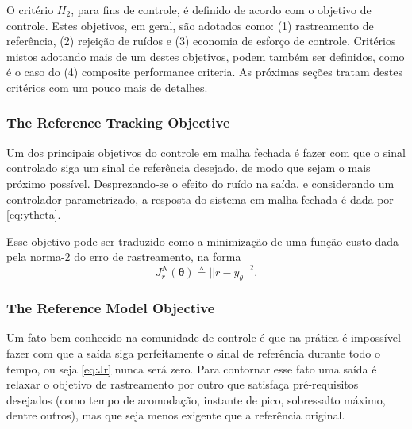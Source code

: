 O critério  $H_2$, para fins de controle, é definido de acordo com o objetivo de controle. Estes objetivos, em geral, são adotados como: (1) rastreamento de referência, (2) rejeição de ruídos e (3) economia de esforço de controle. Critérios mistos adotando mais de um destes objetivos, podem também ser definidos, como é o caso do (4) composite performance criteria. As próximas seções tratam destes critérios com um pouco mais de detalhes.


\subsubsection{The Reference Tracking Objective}%
\label{sub:the_reference_tracking_objective}
Um dos principais objetivos do controle em malha fechada é fazer com que o sinal controlado siga um sinal de referência desejado, de modo que sejam o mais próximo possível. Desprezando-se o efeito do ruído na saída, e considerando um controlador parametrizado, a resposta do sistema em malha fechada é dada por \eqref{eq:ytheta}.

Esse objetivo pode ser traduzido como a minimização de uma função custo dada pela norma-2 do erro de rastreamento, na forma
\begin{equation}
   J_r^N(\bm{\theta}) \triangleq || r - y_\theta ||^2 .
   \label{eq:Jr}
\end{equation}

\subsubsection{The Reference Model Objective}%
\label{sub:The Reference Model Objective}

Um fato bem conhecido na comunidade de controle é que na prática é impossível fazer com que a saída siga perfeitamente o sinal de referência durante todo o tempo, ou seja \eqref{eq:Jr} nunca será zero.
Para contornar esse fato uma saída é relaxar o objetivo de rastreamento por outro que satisfaça pré-requisitos desejados (como tempo de acomodação, instante de pico, sobressalto máximo, dentre outros), mas que seja menos exigente que a referência original.

